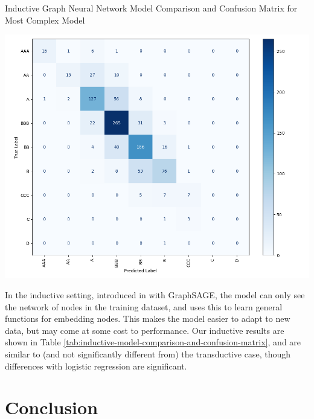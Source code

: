 \documentclass{article}[11pt]
\begin{document}
    \begin{table}[h!]
        \centering
        \caption{Inductive Graph Neural Network Model Comparison and Confusion Matrix for Most Complex Model}
        \begin{minipage}[c]{0.495\linewidth}
            \centering
            
        \end{minipage}
        \begin{minipage}[c]{0.495\linewidth}
            \centering
            \includegraphics[width=0.95\hsize]{../Output/Modelling/Graph Neural Network/Inductive/confusion_matrix_no_title.png}
        \end{minipage}
        \label{tab:inductive-model-comparison-and-confusion-matrix}
    \end{table}


    In the inductive setting, introduced in \cite{hamilton_inductive_2018} with GraphSAGE, the model can only see the network of nodes in the training dataset, and uses this to learn general functions for embedding nodes. This makes the model easier to adapt to new data, but may come at some cost to performance. Our inductive results are shown in Table \ref{tab:inductive-model-comparison-and-confusion-matrix}, and are similar to (and not significantly different from) the transductive case, though differences with logistic regression are significant.

    \section*{Conclusion}
\end{document}
